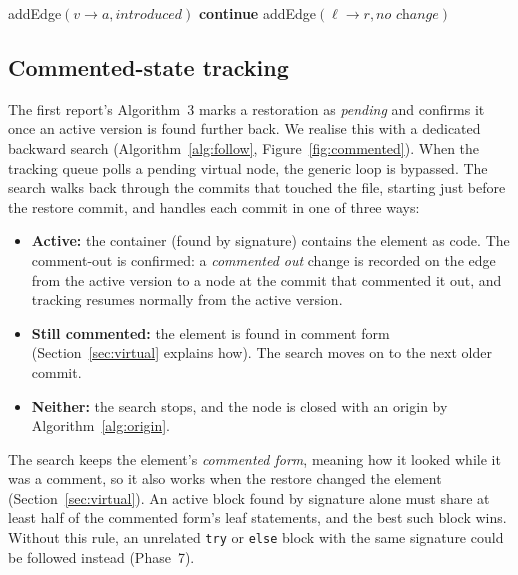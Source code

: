 \documentclass[11pt,a4paper]{article}
\newcommand{\code}[1]{\texttt{#1}}
\newcommand{\change}[1]{\textit{#1}}
\begin{document}
\begin{algorithm}[t]
\caption{Origin guarantee and cycle-safe linking}\label{alg:origin}
\begin{algorithmic}[1]
 
     addEdge$(v \to a, \textit{introduced})$  \EndIf
  \EndFor
\EndProcedure
{}
     \textbf{continue}  \EndIf
    \State addEdge$(\ell \to r, \textit{no change})$
  \EndFor
\EndProcedure
\end{algorithmic}
\end{algorithm}

\subsection{Commented-state tracking}\label{sec:commented}
The first report's Algorithm~3 marks a restoration as \emph{pending} and confirms it once an active version is found further back. We realise this with a dedicated backward search (Algorithm~\ref{alg:follow}, Figure~\ref{fig:commented}). When the tracking queue polls a pending virtual node, the generic loop is bypassed. The search walks back through the commits that touched the file, starting just before the restore commit, and handles each commit in one of three ways:
\begin{itemize}
  \item \textbf{Active:} the container (found by signature) contains the element as code. The comment-out is confirmed: a \change{commented out} change is recorded on the edge from the active version to a node at the commit that commented it out, and tracking resumes normally from the active version.
  \item \textbf{Still commented:} the element is found in comment form (Section~\ref{sec:virtual} explains how). The search moves on to the next older commit.
  \item \textbf{Neither:} the search stops, and the node is closed with an origin by Algorithm~\ref{alg:origin}.
\end{itemize}
The search keeps the element's \emph{commented form}, meaning how it looked while it was a comment, so it also works when the restore changed the element (Section~\ref{sec:virtual}). An active block found by signature alone must share at least half of the commented form's leaf statements, and the best such block wins. Without this rule, an unrelated \code{try} or \code{else} block with the same signature could be followed instead (Phase~7).
\end{document}

